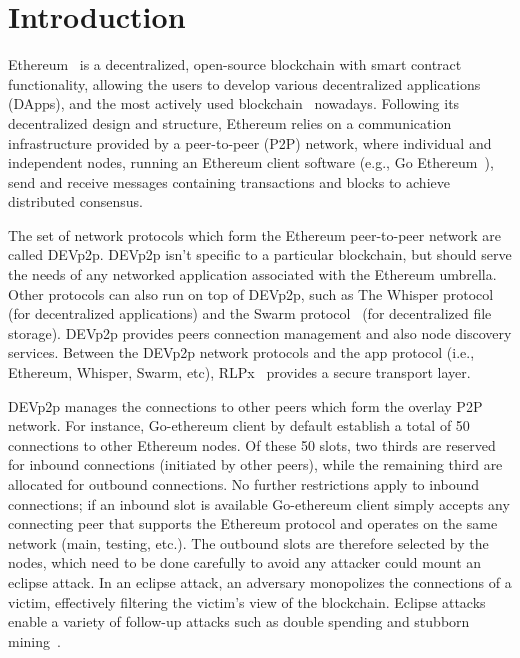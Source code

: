 
\section{Introduction}

Ethereum~\cite{} is a decentralized, open-source blockchain with smart contract functionality, allowing the users to develop various decentralized applications (DApps),  and the most actively used blockchain~\cite{bloomberg} nowadays.
Following its decentralized design and structure, Ethereum relies on a communication infrastructure provided by a peer-to-peer (P2P) network, where individual and independent nodes, running an Ethereum client software (e.g., Go Ethereum~\cite{go-ethereum}), send and receive messages  containing transactions and blocks to achieve distributed consensus.

The set of network protocols which form the Ethereum peer-to-peer network are called DEVp2p.  DEVp2p isn't specific to a particular blockchain, but should serve the needs of any networked application associated with the Ethereum umbrella.
Other protocols can also run on top of DEVp2p,  such as 
The Whisper protocol~\cite{} (for decentralized
applications) and the Swarm protocol~\cite{} (for decentralized file
storage).
DEVp2p provides peers connection management and also node discovery services.
Between the DEVp2p network protocols and the app protocol (i.e., Ethereum, Whisper, Swarm, etc), RLPx~\cite{} provides a secure transport layer. 

DEVp2p manages the connections to other peers which form the overlay P2P network.
For instance,  Go-ethereum client by default establish a total of 50  connections to other Ethereum nodes.  Of these 50 slots,  two thirds are reserved for inbound connections (initiated by other peers),  while the remaining third are allocated for outbound connections. 
No further restrictions apply to inbound connections; if an inbound slot is available
Go-ethereum client simply accepts any connecting peer that supports the
Ethereum protocol and operates on the same network (main,
testing, etc.). 
The outbound slots are therefore selected by the nodes, which need to be done carefully to avoid any attacker could mount an eclipse attack.
In an eclipse attack, an
adversary monopolizes the connections of a victim, effectively
filtering the victim’s view of the blockchain.  Eclipse attacks
enable a variety of follow-up attacks such as double spending
and stubborn mining~\cite{}.

